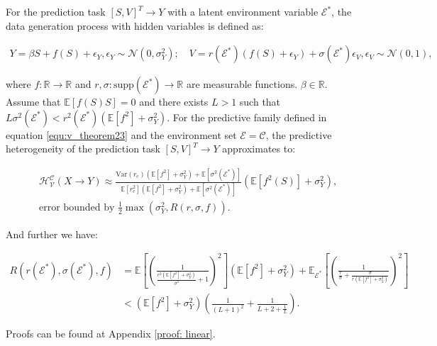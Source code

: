  \begin{theorem}
 \label{theorem: omitted variable}
 	For the prediction task $[S,V]^T\rightarrow Y$ with a latent environment variable $\mathcal E^*$, the data generation process with hidden variables is defined as:
 	\begin{small}
 	\begin{align}
 		Y = \beta S + f(S) + \epsilon_Y, \epsilon_Y\sim\mathcal{N}(0, \sigma_Y^2); \quad V = r(\mathcal E^*) (f(S)+\epsilon_Y) + \sigma(\mathcal E^*)\epsilon_V, \epsilon_V \sim\mathcal{N}(0, 1),
 	\end{align}
 	\end{small}
 	where  $f:\mathbb R\rightarrow \mathbb R$ and $r,\sigma:\text{supp}(\mathcal E^*) \rightarrow \mathbb R$ are measurable functions. $\beta \in \mathbb R$.
 	Assume that $\mathbb{E}[f(S)S]=0$ and there exists $L>1$ such that $L\sigma^2(\mathcal E^*) < r^2(\mathcal E^*)(\mathbb{E}[f^2]+\sigma_Y^2)$. 
 	For the predictive family defined in equation \ref{equ:v_theorem23} and the environment set $\mathscr E = \mathcal C$, the predictive heterogeneity of the prediction task $[S,V]^T\rightarrow Y$ approximates to:
 	\begin{small}
	\begin{equation}
	\begin{aligned}
	\label{equ:approximation2}
		&\mathcal{H}^\mathcal C_{\mathcal{V}}(X\rightarrow Y) \approx \frac{\text{Var}(r_e)(\mathbb{E}[f^2]+\sigma_Y^2)+\mathbb{E}[\sigma^2(\mathcal E^*)]}{\mathbb{E}[r_e^2](\mathbb{E}[f^2]+\sigma_Y^2)+\mathbb{E}[\sigma^2(\mathcal E^*)]}(\mathbb{E}[f^2(S)]+\sigma_Y^2),\\
		&\text{error bounded by }\frac{1}{2}\max(\sigma_Y^2,R(r,\sigma,f)).
	\end{aligned}
	\end{equation}	
	\end{small}
	And further we have:
	\begin{small}
	\begin{equation}
		\begin{aligned}
			R(r(\mathcal E^*), \sigma(\mathcal E^*), f) &= \mathbb{E}[(\frac{1}{\frac{r^2(\mathbb{E}[f^2]+\sigma_Y^2)}{\sigma^2}+1})^2](\mathbb{E}[f^2]+\sigma_Y^2)+ \mathbb{E}_{\mathcal{E}^*}[(\frac{1}{\frac{r}{\sigma}+\frac{\sigma}{r(\mathbb{E}[f^2]+\sigma_Y^2)}})^2]\\
			&<(\mathbb{E}[f^2]+\sigma_Y^2)(\frac{1}{(L+1)^2}+\frac{1}{L+2+\frac{1}{L}}).
		\end{aligned}
	\end{equation}	
	\end{small}
	Proofs can be found at Appendix \ref{proof: linear}.
 \end{theorem}



